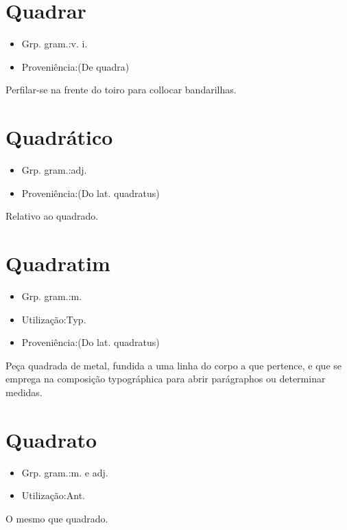 \section{Quadrar}
\begin{itemize}
\item {Grp. gram.:v. i.}
\end{itemize}
\begin{itemize}
\item {Proveniência:(De \textunderscore quadra\textunderscore )}
\end{itemize}
Perfilar-se na frente do toiro para collocar bandarilhas.
\section{Quadrático}
\begin{itemize}
\item {Grp. gram.:adj.}
\end{itemize}
\begin{itemize}
\item {Proveniência:(Do lat. \textunderscore quadratus\textunderscore )}
\end{itemize}
Relativo ao quadrado.
\section{Quadratim}
\begin{itemize}
\item {Grp. gram.:m.}
\end{itemize}
\begin{itemize}
\item {Utilização:Typ.}
\end{itemize}
\begin{itemize}
\item {Proveniência:(Do lat. \textunderscore quadratus\textunderscore )}
\end{itemize}
Peça quadrada de metal, fundida a uma linha do corpo a que pertence, e que se emprega na composição typográphica para abrir parágraphos ou determinar medidas.
\section{Quadrato}
\begin{itemize}
\item {Grp. gram.:m.  e  adj.}
\end{itemize}
\begin{itemize}
\item {Utilização:Ant.}
\end{itemize}
O mesmo que \textunderscore quadrado\textunderscore .
